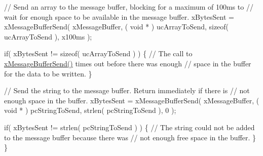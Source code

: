 \begin{DoxyPre} // Send an array to the message buffer, blocking for a maximum of 100ms to
 // wait for enough space to be available in the message buffer.
 xBytesSent = xMessageBufferSend( xMessageBuffer, ( void * ) ucArrayToSend, sizeof( ucArrayToSend ), x100ms );\end{DoxyPre}



\begin{DoxyPre} if( xBytesSent != sizeof( ucArrayToSend ) )
 \{
     // The call to \hyperlink{message__buffer_8h_a858f6da6fe24a226c45caf1634ea1605}{xMessageBufferSend()} times out before there was enough
     // space in the buffer for the data to be written.
 \}\end{DoxyPre}



\begin{DoxyPre} // Send the string to the message buffer.  Return immediately if there is
 // not enough space in the buffer.
 xBytesSent = xMessageBufferSend( xMessageBuffer, ( void * ) pcStringToSend, strlen( pcStringToSend ), 0 );\end{DoxyPre}



\begin{DoxyPre} if( xBytesSent != strlen( pcStringToSend ) )
 \{
     // The string could not be added to the message buffer because there was
     // not enough free space in the buffer.
 \}
\}
\end{DoxyPre}
 